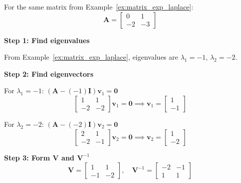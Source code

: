 \begin{example}
\label{ex:matrix_exp_eigen}
For the same matrix from Example~\ref{ex:matrix_exp_laplace}:
\begin{equation}
\mathbf{A} = \begin{bmatrix} 0 & 1 \\ -2 & -3 \end{bmatrix}
\end{equation}

\textbf{Step 1: Find eigenvalues}

From Example~\ref{ex:matrix_exp_laplace}, eigenvalues are $\lambda_1 = -1$, $\lambda_2 = -2$.

\textbf{Step 2: Find eigenvectors}

For $\lambda_1 = -1$: $(\mathbf{A} - (-1)\mathbf{I})\mathbf{v}_1 = \mathbf{0}$
\begin{equation}
\begin{bmatrix} 1 & 1 \\ -2 & -2 \end{bmatrix}\mathbf{v}_1 = \mathbf{0} \implies \mathbf{v}_1 = \begin{bmatrix} 1 \\ -1 \end{bmatrix}
\end{equation}

For $\lambda_2 = -2$: $(\mathbf{A} - (-2)\mathbf{I})\mathbf{v}_2 = \mathbf{0}$
\begin{equation}
\begin{bmatrix} 2 & 1 \\ -2 & -1 \end{bmatrix}\mathbf{v}_2 = \mathbf{0} \implies \mathbf{v}_2 = \begin{bmatrix} 1 \\ -2 \end{bmatrix}
\end{equation}

\textbf{Step 3: Form $\mathbf{V}$ and $\mathbf{V}^{-1}$}
\begin{equation}
\mathbf{V} = \begin{bmatrix} 1 & 1 \\ -1 & -2 \end{bmatrix}, \quad
\mathbf{V}^{-1} = \begin{bmatrix} -2 & -1 \\ 1 & 1 \end{bmatrix}
\end{equation}


\end{example}
